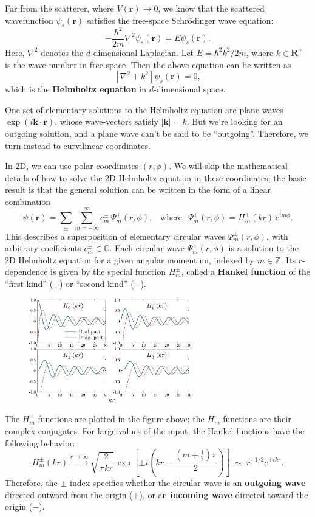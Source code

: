 \documentclass[pra,12pt]{revtex4}
\begin{document}
Far from the scatterer, where $V(\mathbf{r})\rightarrow 0$, we know
that the scattered wavefunction $\psi_s(\mathbf{r})$ satisfies the
free-space Schr\"odinger wave equation:
$$-\frac{\hbar^2}{2m} \nabla^2 \psi_s(\mathbf{r}) = E \psi_s(\mathbf{r}).$$
Here, $\nabla^2$ denotes the $d$-dimensional Laplacian.  Let $E =
\hbar^2 k^2 / 2m$, where $k \in \mathbf{R}^+$ is the wave-number in
free space.  Then the above equation can be written as
$$\left[\nabla^2 + k^2\right] \psi_s(\mathbf{r}) = 0,$$
which is the \textbf{Helmholtz equation} in $d$-dimensional space.

One set of elementary solutions to the Helmholtz equation are plane
waves $\exp(i\mathbf{k}\cdot\mathbf{r})$, whose wave-vectors satisfy
$|\mathbf{k}| = k$.  But we're looking for an outgoing solution, and
a plane wave can't be said to be ``outgoing''.  Therefore, we turn
instead to curvilinear coordinates.

In 2D, we can use polar coordinates $(r,\phi)$.  We will skip the
mathematical details of how to solve the 2D Helmholtz equation in
these coordinates; the basic result is that the general solution can
be written in the form of a linear combination
$$\psi(\mathbf{r})=\sum_{\pm}\sum_{m=-\infty}^\infty c_m^\pm\,\Psi_m^\pm(r,\phi), \;\;\;\mathrm{where}\;\;\,\Psi_m^\pm(r,\phi) = H_m^\pm(kr)\,e^{im\phi}.$$
This describes a superposition of elementary circular waves
$\Psi_m^\pm(r,\phi)$, with arbitrary coefficients $c_m^\pm \in
\mathbb{C}$.  Each circular wave $\Psi_m^\pm(r,\phi)$ is a solution to
the 2D Helmholtz equation for a given angular momentum, indexed by $m
\in \mathbb{Z}$.  Its $r$-dependence is given by the special function
$H_m^\pm$, called a \textbf{Hankel function} of the ``first kind''
($+$) or ``second kind'' ($-$).

\begin{figure}[h!]
  \centering\includegraphics[width=0.63\textwidth]{besselh}
\end{figure}

The $H^+_m$ functions are plotted in the figure above; the $H^-_m$
functions are their complex conjugates.  For large values of the
input, the Hankel functions have the following behavior:
$$H_m^\pm(kr) \overset{r\rightarrow\infty}{\longrightarrow} \sqrt{\frac{2}{\pi kr}} \, \exp\left[\pm i\left(kr - \frac{(m+\frac{1}{2})\pi}{2}\right)\right] \;\sim\; r^{-1/2} e^{\pm ikr}.$$
Therefore, the $\pm$ index specifies whether the circular wave is an
\textbf{outgoing wave} directed outward from the origin ($+$), or an
\textbf{incoming wave} directed toward the origin ($-$).
\end{document}
